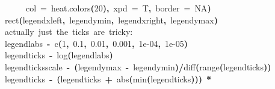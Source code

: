 \documentclass[a4paper]{article}
\newcommand{\hlnumber}[1]{\textcolor[rgb]{0.0823529411764706,0.0784313725490196,0.709803921568627}{#1}}%
\newcommand{\hlfunctioncall}[1]{\textcolor[rgb]{1,0,0}{#1}}%
\newcommand{\hlkeyword}[1]{\textcolor[rgb]{0,0,0}{\textbf{#1}}}%
\newcommand{\hlargument}[1]{\textcolor[rgb]{0.694117647058824,0.247058823529412,0.0196078431372549}{#1}}%
\newcommand{\hlcomment}[1]{\textcolor[rgb]{0.8,0.8,0.8}{#1}}%
\newcommand{\hlassignement}[1]{\textcolor[rgb]{0.215686274509804,0.215686274509804,0.384313725490196}{\textbf{#1}}}%
\newcommand{\hlsymbol}[1]{\textcolor[rgb]{0,0,0}{#1}}%
\newcommand{\hlprompt}[1]{\textcolor[rgb]{0,0,0}{#1}}%
\newcommand{\hlstd}[1]{\textcolor[rgb]{0,0,0}{#1}}%
\newenvironment{Houtput}{\raggedright}{%
%
}
\begin{document}
\begin{Houtput}
\hlstd{}\hlprompt{{\ }}{\ }{\ }{\ }{\ }\hlargument{col}{\ }\hlargument{=}{\ }\hlfunctioncall{heat.colors}\hlkeyword{(}\hlnumber{20}\hlkeyword{)}\hlkeyword{,}{\ }\hlargument{xpd}{\ }\hlargument{=}{\ }\hlsymbol{T}\hlkeyword{,}{\ }\hlargument{border}{\ }\hlargument{=}{\ }\hlnumber{NA}\hlkeyword{)}\mbox{}
\normalfont
\hspace*{\fill}\\
\hlstd{}\ttfamily\noindent
\hlprompt{\usebox{\hlnormalsizeboxgreaterthan}{\ }}\hlfunctioncall{rect}\hlkeyword{(}\hlsymbol{legendxleft}\hlkeyword{,}{\ }\hlsymbol{legendymin}\hlkeyword{,}{\ }\hlsymbol{legendxright}\hlkeyword{,}{\ }\hlsymbol{legendymax}\hlkeyword{)}\mbox{}
\normalfont
\hspace*{\fill}\\
\hlstd{}\ttfamily\noindent
\hlprompt{\usebox{\hlnormalsizeboxgreaterthan}{\ }}\hlcomment{\usebox{\hlnormalsizeboxhash}{\ }actually{\ }just{\ }the{\ }ticks{\ }are{\ }tricky:}\mbox{}
\normalfont
\hspace*{\fill}\\
\hlstd{}\ttfamily\noindent
\hlprompt{\usebox{\hlnormalsizeboxgreaterthan}{\ }}\hlsymbol{legendlabs}{\ }\hlassignement{\usebox{\hlnormalsizeboxlessthan}-}{\ }\hlfunctioncall{c}\hlkeyword{(}\hlnumber{1}\hlkeyword{,}{\ }\hlnumber{0.1}\hlkeyword{,}{\ }\hlnumber{0.01}\hlkeyword{,}{\ }\hlnumber{0.001}\hlkeyword{,}{\ }\hlnumber{1e-04}\hlkeyword{,}{\ }\hlnumber{1e-05}\hlkeyword{)}\mbox{}
\normalfont
\hspace*{\fill}\\
\hlstd{}\ttfamily\noindent
\hlprompt{\usebox{\hlnormalsizeboxgreaterthan}{\ }}\hlsymbol{legendticks}{\ }\hlassignement{\usebox{\hlnormalsizeboxlessthan}-}{\ }\hlfunctioncall{log}\hlkeyword{(}\hlsymbol{legendlabs}\hlkeyword{)}\mbox{}
\normalfont
\hspace*{\fill}\\
\hlstd{}\ttfamily\noindent
\hlprompt{\usebox{\hlnormalsizeboxgreaterthan}{\ }}\hlsymbol{legendticksscale}{\ }\hlassignement{\usebox{\hlnormalsizeboxlessthan}-}{\ }\hlkeyword{(}\hlsymbol{legendymax}{\ }\hlkeyword{-}{\ }\hlsymbol{legendymin}\hlkeyword{)}\hlkeyword{/}\hlfunctioncall{diff}\hlkeyword{(}\hlfunctioncall{range}\hlkeyword{(}\hlsymbol{legendticks}\hlkeyword{)}\hlkeyword{)}\mbox{}
\normalfont
\hspace*{\fill}\\
\hlstd{}\ttfamily\noindent
\hlprompt{\usebox{\hlnormalsizeboxgreaterthan}{\ }}\hlsymbol{legendticks}{\ }\hlassignement{\usebox{\hlnormalsizeboxlessthan}-}{\ }\hlkeyword{(}\hlsymbol{legendticks}{\ }\hlkeyword{+}{\ }\hlfunctioncall{abs}\hlkeyword{(}\hlfunctioncall{min}\hlkeyword{(}\hlsymbol{legendticks}\hlkeyword{)}\hlkeyword{)}\hlkeyword{)}{\ }\hlkeyword{*}\hspace*{\fill}\\

\end{Houtput}
\end{document}
